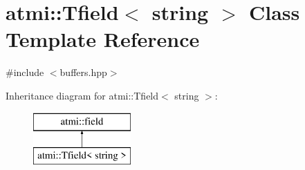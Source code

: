 \hypertarget{classatmi_1_1_tfield_3_01string_01_4}{}\section{atmi\+:\+:Tfield$<$ string $>$ Class Template Reference}
\label{classatmi_1_1_tfield_3_01string_01_4}


{\ttfamily \#include $<$buffers.\+hpp$>$}

Inheritance diagram for atmi\+:\+:Tfield$<$ string $>$\+:\begin{figure}[H]
\begin{center}
\leavevmode
\includegraphics[height=2.000000cm]{classatmi_1_1_tfield_3_01string_01_4}
\end{center}
\end{figure}
